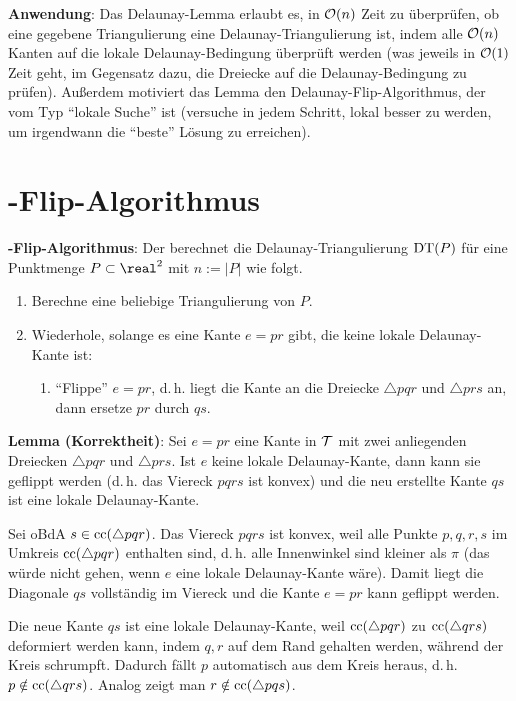 \linie

\textbf{Anwendung}:
Das Delaunay-Lemma erlaubt es, in $\mathcal{O}(n)$ Zeit zu überprüfen, ob eine gegebene Triangulierung
eine Delaunay-Triangulierung ist, indem alle
$\mathcal{O}(n)$ Kanten auf die lokale Delaunay-Bedingung überprüft werden
(was jeweils in $\mathcal{O}(1)$ Zeit geht,
im Gegensatz dazu, die Dreiecke auf die Delaunay-Bedingung zu prüfen).
Außerdem motiviert das Lemma den Delaunay-Flip-Algorithmus, der vom Typ "`lokale Suche"' ist
(versuche in jedem Schritt, lokal besser zu werden, um irgendwann die "`beste"' Lösung zu
erreichen).

\pagebreak

\section{%
    -Flip-Algorithmus%
}

\textbf{-Flip-Algorithmus}:
Der  berechnet die Delaunay-Triangulierung $\operatorname{DT}(P)$
für eine Punktmenge $P \subset \real^2$ mit $n := |P|$ wie folgt.
\begin{enumerate}
    \item
    Berechne eine beliebige Triangulierung von $P$.

    \item
    Wiederhole, solange es eine Kante $e = pr$ gibt, die keine lokale Delaunay-Kante ist:
    \begin{enumerate}
        \item
        "`Flippe"' $e = pr$,
        d.\,h. liegt die Kante an die Dreiecke $\triangle pqr$ und $\triangle prs$ an,
        dann ersetze $pr$ durch $qs$.
    \end{enumerate}
\end{enumerate}

\linie

\textbf{Lemma (Korrektheit)}:
Sei $e = pr$ eine Kante in $\mathcal{T}$ mit zwei anliegenden Dreiecken $\triangle pqr$ und $\triangle prs$.
Ist $e$ keine lokale Delaunay-Kante, dann kann sie geflippt werden
(d.\,h. das Viereck $pqrs$ ist konvex)
und die neu erstellte Kante $qs$ ist eine lokale Delaunay-Kante.

\begin{Beweis}
    Sei oBdA $s \in \operatorname{cc}(\triangle pqr)$.
    Das Viereck $pqrs$ ist konvex, weil alle Punkte $p, q, r, s$ im Umkreis $\operatorname{cc}(\triangle pqr)$
    enthalten sind, d.\,h. alle Innenwinkel sind kleiner als $\pi$
    (das würde nicht gehen, wenn $e$ eine lokale Delaunay-Kante wäre).
    Damit liegt die Diagonale $qs$ vollständig im Viereck und die Kante $e = pr$ kann geflippt
    werden.

    Die neue Kante $qs$ ist eine lokale Delaunay-Kante, weil $\operatorname{cc}(\triangle pqr)$ zu
    $\operatorname{cc}(\triangle qrs)$ deformiert werden kann, indem $q, r$ auf dem Rand gehalten werden,
    während der Kreis schrumpft.
    Dadurch fällt $p$ automatisch aus dem Kreis heraus, d.\,h. $p \notin \operatorname{cc}(\triangle qrs)$.
    Analog zeigt man $r \notin \operatorname{cc}(\triangle pqs)$.
\end{Beweis}

